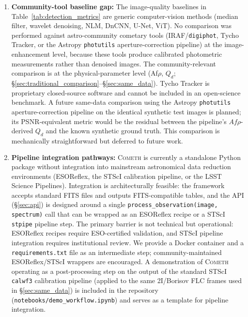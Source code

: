\documentclass[usenatbib]{mnras}
\begin{document}
\begin{enumerate}
    \item \textbf{Community-tool baseline gap:} The image-quality baselines in Table~\ref{tab:detection_metrics} are generic computer-vision methods (median filter, wavelet denoising, NLM, DnCNN, U-Net, ViT). No comparison was performed against astro-community cometary tools (IRAF/\texttt{digiphot}, Tycho Tracker, or the Astropy \texttt{photutils} aperture-correction pipeline) at the image-enhancement level, because these tools produce calibrated photometric measurements rather than denoised images. The community-relevant comparison is at the physical-parameter level (Af$\rho$, $Q_d$; \S\ref{sec:traditional_comparison}--\S\ref{sec:same_data}). Tycho Tracker is proprietary closed-source software and cannot be included in an open-science benchmark. A future same-data comparison using the Astropy \texttt{photutils} aperture-correction pipeline on the identical synthetic test images is planned; its PSNR-equivalent metric would be the residual between the pipeline's $Af\rho$-derived $Q_d$ and the known synthetic ground truth. This comparison is mechanically straightforward but deferred to future work.
    \item \textbf{Pipeline integration pathways:} \textsc{Cometh} is currently a standalone Python package without integration into mainstream astronomical data reduction environments (ESOReflex, the STScI calibration pipeline, or the LSST Science Pipelines). Integration is architecturally feasible: the framework accepts standard FITS files and outputs FITS-compatible tables, and the API (\S\ref{sec:api}) is designed around a single \texttt{process\_observation(image, spectrum)} call that can be wrapped as an ESOReflex recipe or a STScI \texttt{stpipe} pipeline step. The primary barrier is not technical but operational: ESOReflex recipes require ESO-certified validation, and STScI pipeline integration requires institutional review. We provide a Docker container and a \texttt{requirements.txt} file as an intermediate step; community-maintained ESOReflex/STScI wrappers are encouraged. A demonstration of \textsc{Cometh} operating as a post-processing step on the output of the standard STScI \texttt{calwf3} calibration pipeline (applied to the same 2I/Borisov FLC frames used in \S\ref{sec:same_data}) is included in the repository (\texttt{notebooks/demo\_workflow.ipynb}) and serves as a template for pipeline integration.

\end{enumerate}
\end{document}
